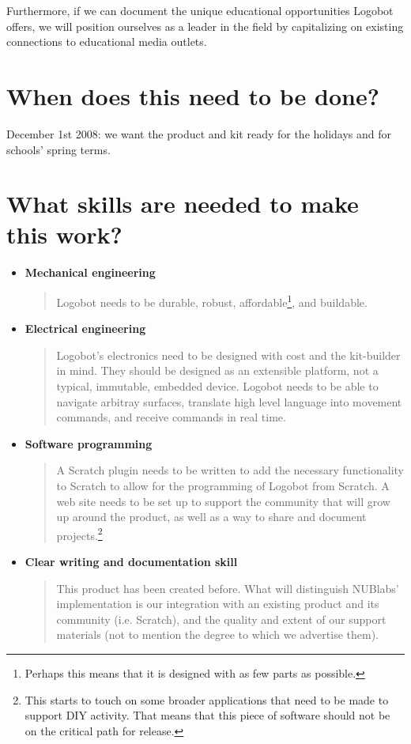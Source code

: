 \documentclass[11pt]{article}
\begin{document}
Furthermore, if we can document the unique educational opportunities Logobot offers, we will position ourselves as a leader in the field by capitalizing on existing connections to educational media outlets.

\section{When does this need to be done?}
December 1st 2008: we want the product and kit ready for the holidays and for schools' spring terms.

\section{What skills are needed to make this work?}
\begin{itemize}
\item \textbf{Mechanical engineering}
  \begin{quote}
    Logobot needs to be durable, robust, affordable\footnote{Perhaps this means that it is designed with as few parts as possible.}, and buildable.
  \end{quote}
\item \textbf{Electrical engineering}
  \begin{quote}
    Logobot's electronics need to be designed with cost and the kit-builder in mind.  They should be designed as an extensible platform, not a typical, immutable, embedded device.  Logobot needs to be able to navigate arbitray surfaces, translate high level language into movement commands, and receive commands in real time.
  \end{quote}
\item \textbf{Software programming}
  \begin{quote}
    A Scratch plugin needs to be written to add the necessary functionality to Scratch to allow for the programming of Logobot from Scratch.  A web site needs to be set up to support the community that will grow up around the product, as well as a way to share and document projects.\footnote{This starts to touch on some broader applications that need to be made to support DIY activity.  That means that this piece of software should not be on the critical path for release.}
  \end{quote}
\item \textbf{Clear writing and documentation skill}
  \begin{quote}
    This product has been created before.  What will distinguish NUBlabs' implementation is our integration with an existing product and its community (i.e. Scratch), and the quality and extent of our support materials (not to mention the degree to which we advertise them).
  \end{quote}
\end{itemize}
\end{document}
